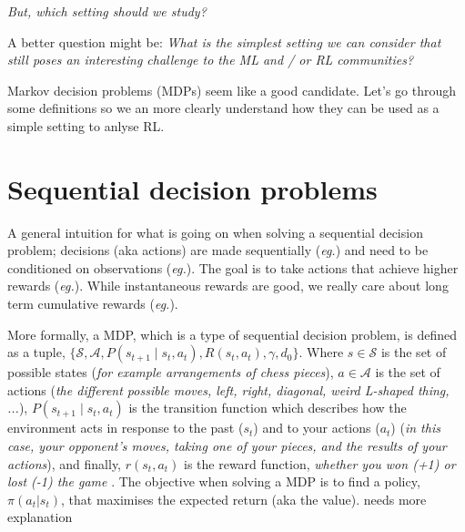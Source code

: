 \begin{displayquote}
  \textit{But, which setting should we study?}
\end{displayquote}

\begin{displayquote}
  A better question might be: \textit{What is the simplest setting we can
  consider that still poses an interesting challenge to the ML and / or RL communities?}
\end{displayquote}

Markov decision problems (MDPs) seem like a good candidate. Let's go through some definitions so we an more clearly understand how they can be used as a
simple setting to anlyse RL.

\section{Sequential decision problems}

A general intuition for what is going on when solving a sequential decision problem; decisions (aka actions) are made
sequentially (\textit{eg.}) and need to be conditioned on observations (\textit{eg.}).
The goal is to take actions that achieve higher rewards (\textit{eg.}). While instantaneous
rewards are good, we really care about long term cumulative rewards (\textit{eg.}).


More formally, a MDP, which is a type of sequential decision problem, is defined
as a tuple, $\{\mathcal S, \mathcal A, P(s_{t+1} \mid s_t, a_t),R(s_t, a_t), \gamma, d_0\}$.
Where \(s \in \mathcal S\) is the set of possible states (\textit{for example arrangements of chess pieces}),
\(a \in \mathcal A\) is the set of actions (\textit{the different possible moves, left,
right, diagonal, weird L-shaped thing, ...}),  \(P(s_{t+1} \mid s_t, a_t)\)
is the transition function which describes how the environment acts in response
to the past (\(s_t\)) and to your actions (\(a_t\)) (\textit{in this case, your
opponent's moves, taking one of your pieces, and the results of your actions}),
and finally, \(r(s_t, a_t)\) is the reward function, \textit{whether you won (+1) or lost (-1) the game }.
The objective when solving a MDP is to find a policy, $\pi(a_t | s_t)$,
that maximises the expected return (aka the value). {\color{red}needs more explanation}

